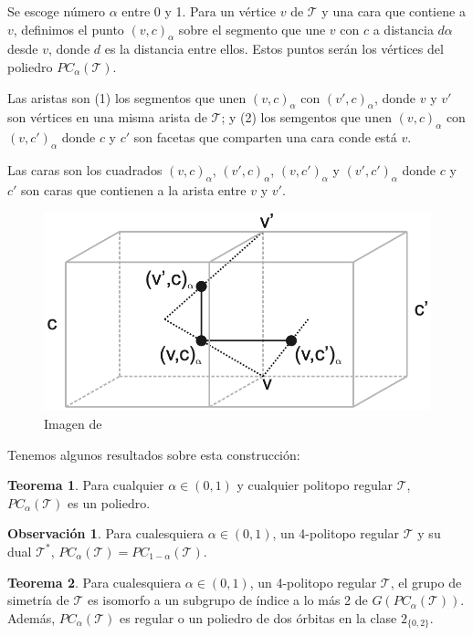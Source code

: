\documentclass[spanish]{article}
\theoremstyle{definition}
\newtheorem*{obs}{Observación}
\newtheorem*{teo}{Teorema}
\newcommand{\T}{\mathcal{T}}
\begin{document}
Se escoge número $\alpha$ entre 0 y 1. Para un vértice $v$ de $\T$ y una cara que contiene a $v$, definimos el punto $(v,c)_\alpha$ sobre el segmento que une $v$ con $c$ a distancia $d\alpha$ desde $v$, donde $d$ es la distancia entre ellos. Estos puntos serán los vértices del poliedro $PC_\alpha(\T)$.

Las aristas son (1) los segmentos que unen $(v,c)_\alpha$ con $(v',c)_\alpha$, donde $v$ y $v'$ son vértices en una misma arista de $\T$; y (2) los semgentos que unen  $(v,c)_\alpha$ con $(v,c')_\alpha$ donde $c$ y $c'$ son facetas que comparten una cara conde está $v$.

Las caras son los cuadrados $(v,c)_\alpha$, $(v',c)_\alpha$, $(v,c')_\alpha$ y $(v',c')_\alpha$ donde $c$ y $c'$ son caras que contienen a la arista entre $v$ y $v'$.

\begin{figure}[H]
	\centering
	\includegraphics[width=0.5\linewidth]{p3}
	\caption*{Imagen de \cite{bracho2021quiral}}
\end{figure}
Tenemos algunos resultados sobre esta construcción:
\begin{teo}
	Para cualquier $\alpha\in(0,1)$ y cualquier politopo regular $\T$, $PC_\alpha(\T)$ es un poliedro.
\end{teo}
\begin{obs}
	Para cualesquiera $\alpha\in(0,1)$, un 4-politopo regular $\T$ y su dual $\T^*$, $PC_\alpha(\T)=PC_{1-\alpha}(\T)$.
\end{obs}
\begin{teo}
	Para cualesquiera $\alpha\in(0,1)$, un 4-politopo regular $\T$, el grupo de simetría de $\T$ es isomorfo a un subgrupo de índice a lo más 2 de $G(PC_\alpha(\T))$. Además, $PC_\alpha(\T)$ es regular o un poliedro de dos órbitas en la clase $2_{\{0,2\}}$.
\end{teo}
\end{document}
